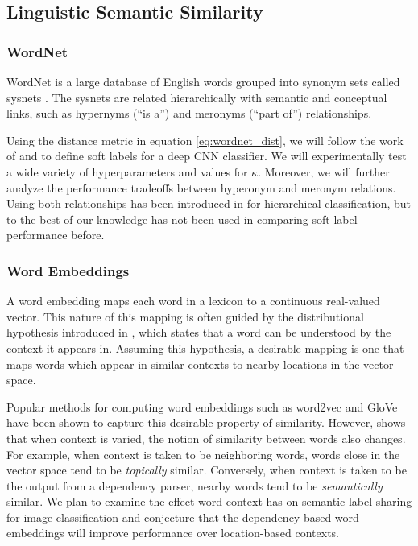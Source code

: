 \subsection{Linguistic Semantic Similarity}


\subsubsection{WordNet}

WordNet is a large database of English words grouped into synonym sets called
sysnets \cite{miller1995wordnet}.
The sysnets are related hierarchically with semantic and conceptual links, such
as hypernyms (``is a'') and meronyms (``part of'') relationships.

Using the distance metric in equation \ref{eq:wordnet_dist}, we will follow the
work of \cite{fergus2010semantic} and \cite{zhao2011large} to define soft
labels for a deep CNN classifier. We will experimentally test a wide variety of
hyperparameters and values for $\kappa$.
Moreover, we will further analyze the performance tradeoffs between hyperonym
and meronym relations. Using both relationships has been introduced in
\cite{marszalek2007semantic} for hierarchical classification, but to the best
of our knowledge has not been used in comparing soft label performance before.


\subsubsection{Word Embeddings}

A word embedding maps each word in a lexicon to a continuous
real-valued vector. This nature of this mapping is often guided by the
distributional hypothesis introduced in
\cite{harris1954distributional}, which states that a word can be
understood by the context it appears in. Assuming this hypothesis, a
desirable mapping is one that maps words which appear in similar
contexts to nearby locations in the vector space.

Popular methods for computing word embeddings such as word2vec
\cite{mikolov2013distributed} and GloVe \cite{pennington2014glove}
have been shown to capture this desirable property of similarity.
However, \cite{levy2014dependency} shows that when context is varied,
the notion of similarity between words also changes. For example, when
context is taken to be neighboring words, words close in the vector
space tend to be \emph{topically} similar. Conversely, when context is
taken to be the output from a dependency parser, nearby words tend to
be \emph{semantically} similar. We plan to examine the effect word
context has on semantic label sharing for image classification and
conjecture that the dependency-based word embeddings will improve
performance over location-based contexts.

